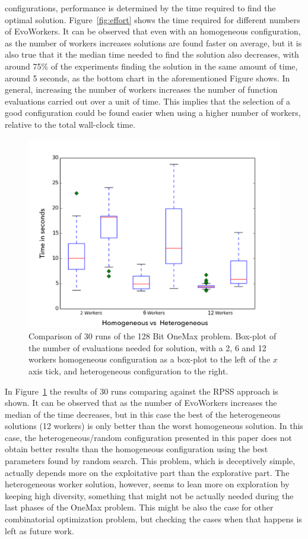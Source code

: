 \documentclass[conference]{IEEEtran}
\begin{document}
configurations, performance is determined by the time required to find the optimal solution.
Figure~\ref{fig:effort} shows the time required for different numbers of EvoWorkers.
It can be observed that even with an homogeneous configuration, as the number of workers
increases solutions are found faster on average, but it is also true
that it the median time needed to find the solution also decreases,
with around 75\% of the experiments finding the solution in the same
amount of time, around 5 seconds, as the bottom chart in the
aforementioned Figure shows.  In general, increasing the number of workers increases
the number of function evaluations carried out over a unit of time. This implies that the selection
of a good configuration could be found easier when using a higher number of workers, relative
to the total wall-clock time.

\begin{figure}[h!t]
    \centering
        \includegraphics[width=12cm]{img/one_max_comp.png}
    \caption{Comparison of 30 runs of the 128 Bit OneMax problem.
    Box-plot of the number of evaluations needed for solution, with a 2, 6 and 12 workers
    homogeneous configuration as a box-plot to the left of the $x$ axis
    tick, and heterogeneous configuration to the right.
    }
    \label{fig:comp-onemax}
  \end{figure}
In Figure~\ref{fig:comp-onemax} the results of 30 runs comparing against the RPSS approach is shown.
It can be observed that as the number of EvoWorkers increases the median of the time decreases, but
in this case the best of the heterogeneous solutions (12 workers) is only better than the worst homogeneous
solution. In this case, the heterogeneous/random configuration
presented in this paper does not obtain better results than the
homogeneous configuration using the best parameters found by random
search. This problem, which is deceptively simple, actually depends
more on the exploitative part than the explorative part. The
heterogeneous worker solution, however, seems to lean more on
exploration by keeping high diversity, something that might not be
actually needed during the last phases of the OneMax problem. This
might be also the case for other combinatorial optimization problem,
but checking the cases when that happens is left as future work.
\end{document}
